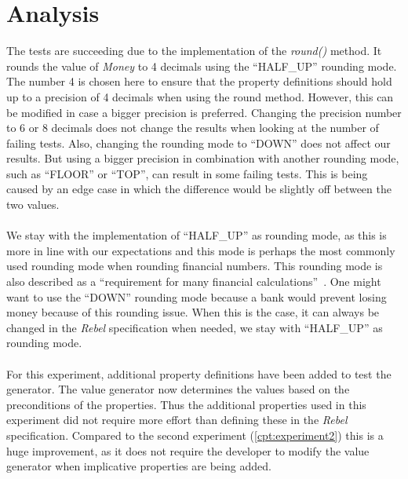 \section{Analysis}
The tests are succeeding due to the implementation of the \textit{round()}
method. It rounds the value of \textit{Money} to 4 decimals using the
``HALF\_UP'' rounding mode. The number 4 is chosen here to ensure that the
property definitions should hold up to a precision of 4 decimals when using the
round method. However, this can be modified in case a bigger precision is
preferred. Changing the precision number to 6 or 8 decimals does not change the
results when looking at the number of failing tests. Also, changing the rounding
mode to ``DOWN'' does not affect our results. But using a bigger precision in
combination with another rounding mode, such as ``FLOOR'' or ``TOP'', can result
in some failing tests. This is being caused by an edge case in which the
difference would be slightly off between the two values.\\
\\
We stay with the implementation of ``HALF\_UP'' as rounding mode, as this is
more in line with our expectations and this mode is perhaps the most commonly
used rounding mode when rounding financial numbers. This rounding mode is also
described as a
``requirement for many financial calculations''~\cite{cowlishaw2003decimal}. One
might want to use the ``DOWN'' rounding mode because a bank would prevent losing
money because of this rounding issue. When this is the case, it can always be
changed in the \textit{Rebel} specification when needed, we stay with
``HALF\_UP'' as rounding mode.\\
\\
For this experiment, additional property definitions have been added to test the
generator. The value generator now determines the values based on the
preconditions of the properties. Thus the additional properties used in this
experiment did not require more effort than defining these in the \textit{Rebel}
specification. Compared to the second experiment (\autoref{cpt:experiment2})
this is a huge improvement, as it does not require the developer to modify the
value generator when implicative properties are being added.

